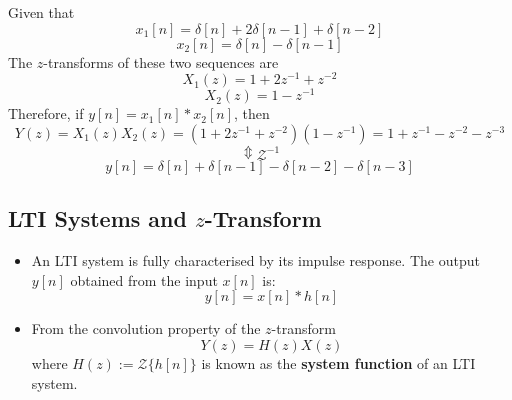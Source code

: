\begin{ex}{}
Given that 
\[
    x_1[n] = \delta[n] + 2\delta[n-1] + \delta[n-2]
\]
\[
    x_2[n] = \delta[n] -\delta[n-1]
\]
The $z$-transforms of these two sequences are
\[
    X_1(z) = 1 + 2z^{-1} +z^{-2}
\]
\[
    X_2(z) = 1 - z^{-1}
\]
Therefore, if $y[n] = x_{1}[n] * x_{2}[n]$, then
\[
    Y(z) = X_{1}(z)X_{2}(z) = (1 + 2z^{-1} +z^{-2})(1 - z^{-1}) = 1 + z^{-1} - z^{-2} - z^{-3}
\]
\[\Updownarrow\mathcal{Z}^{-1}\]
\[
    y[n] = \delta[n] + \delta[n-1] - \delta[n-2] - \delta[n-3]
\]
\end{ex}


\subsection{LTI Systems and $z$-Transform}
\begin{itemize}
    \item An LTI system is fully characterised by its impulse response. The output $y[n]$ obtained from the input $x[n]$ is:
    \[
    y[n] = x[n] * h[n]
    \]

    \item From the convolution property of the $z$-transform
    \[
    Y(z) = H(z)X(z) 
    \]
    where $H(z) := \mathcal{Z}\{h[n]\}$ is known as the \textbf{system function} of an LTI system.
\end{itemize}

